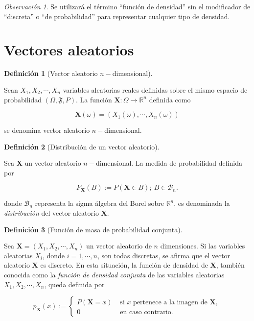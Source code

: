 \documentclass[
  us-letterpaper,
]{scrreprt}
\theoremstyle{plain}
\theoremstyle{definition}
\newtheorem{definition}{Definición}[chapter]
\theoremstyle{definition}
\theoremstyle{plain}
\theoremstyle{remark}
\newtheorem*{remark}{Observación}
\begin{document}
\begin{remark}
Se utilizará el término ``función de densidad'' sin el modificador de
``discreta'' o ``de probabilidad'' para representar cualquier tipo de
densidad.
\end{remark}

\section{Vectores aleatorios}\label{vectores-aleatorios}

\begin{definition}[Vector aleatorio
\(n-\)dimensional]\protect\hypertarget{def-randvec}{}\label{def-randvec}

Sean \(X_1,X_2,\cdots, X_n\) variables aleatorias reales definidas sobre
el mismo espacio de probabilidad \((\Omega, \mathfrak F, P)\). La
función \(\mathbf X:\Omega\to\mathbb R^n\) definida como

\[ \mathbf X(\omega)= (X_1(\omega),\cdots,X_n(\omega)) \]

se denomina vector aleatorio \(n-\)dimensional.

\end{definition}

\begin{definition}[Distribución de un vector
aleatorio]\protect\hypertarget{def-drv}{}\label{def-drv}

Sea \(\mathbf X\) un vector aleatorio \(n-\)dimensional. La medida de
probabilidad definida por

\[ P_{\mathbf X} (B) := P(\mathbf X\in B);\  B\in \mathcal B_n. \]

donde \(\mathcal B_n\) representa la sigma álgebra del Borel sobre
\(\mathbb R^n\), es denominada la \emph{distribución} del vector
aleatorio \(\mathbf X\).

\end{definition}

\begin{definition}[Función de masa de probabilidad
conjunta]\protect\hypertarget{def-dcva}{}\label{def-dcva}

Sea \(\mathbf X= (X_1,X_2,\cdots,X_n)\) un vector aleatorio de \(n\)
dimensiones. Si las variables aleatorias \(X_i\), donde
\(i=1,\cdots,n\), son todas discretas, se afirma que el vector aleatorio
\(\mathbf X\) es discreto. En esta situación, la función de densidad de
\(\mathbf X\), también conocida como la \emph{función de densidad
conjunta} de las variables aleatorias \(X_1, X_2, \cdots, X_n\), queda
definida por

\[ p_\mathbf{X}(x):=\begin{cases}P(\mathbf X=x) & \text{ si } x \text{  pertenece a la imagen de } \mathbf X,\\ 0 & \text{ en caso contrario. } \end{cases} \]

\end{definition}
\end{document}
